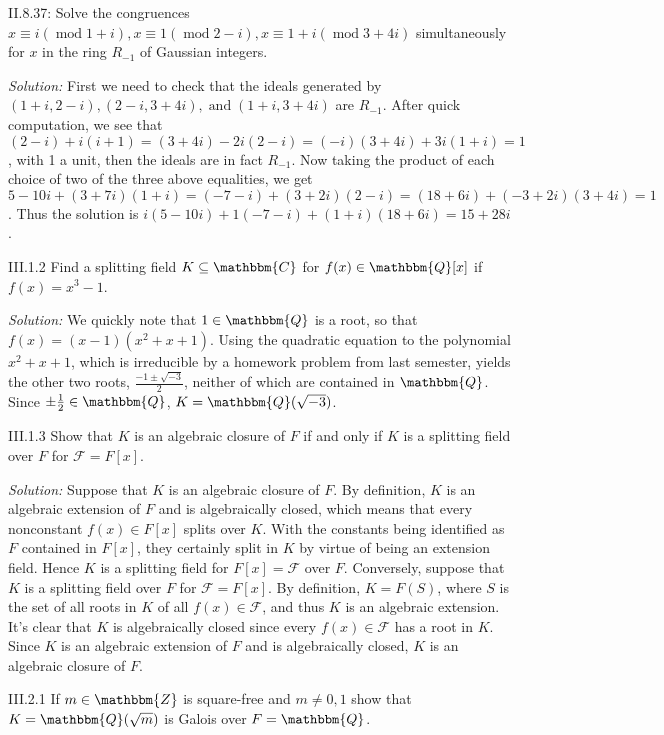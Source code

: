 \documentclass{letter}
\newcommand{\tmem}[1]{{\em #1\/}}
\newcommand{\tmop}[1]{\ensuremath{\operatorname{#1}}}
\begin{document}
II.8.37: Solve the congruences $x \equiv i (\tmop{mod} 1 + i), x \equiv 1
(\tmop{mod} 2 - i), x \equiv 1 + i (\tmop{mod} 3 + 4 i)$ simultaneously for
$x$ in the ring $R_{- 1}$ of Gaussian integers.

{\tmem{Solution:}} First we need to check that the ideals generated by $(1 +
i, 2 - i), (2 - i, 3 + 4 i), \tmop{and} (1 + i, 3 + 4 i)$ are $R_{- 1}$. After
quick computation, we see that $(2 - i) + i (i + 1) = (3 + 4 i) - 2 i (2 - i)
= (- i) (3 + 4 i) + 3 i (1 + i) = 1$, with 1 a unit, then the ideals are in
fact $R_{- 1}$. Now taking the product of each choice of two of the three
above equalities, we get $5 - 10 i + (3 + 7 i) (1 + i) = (- 7 - i) + (3 + 2 i)
(2 - i) = (18 + 6 i) + (- 3 + 2 i) (3 + 4 i) = 1$. Thus the solution is $i (5
- 10 i) + 1 (- 7 - i) + (1 + i) (18 + 6 i) = 15 + 28 i$.

III.1.2 Find a splitting field $K \subseteq \mathbbm{C}$ for $f (x) \in
\mathbbm{Q}[x]$ if $f (x) = x^3 - 1$.

{\tmem{Solution:}} We quickly note that $1 \in \mathbbm{Q}$ is a root, so that
$f (x) = (x - 1) (x^2 + x + 1)$. Using the quadratic equation to the
polynomial $x^2 + x + 1$, which is irreducible by a homework problem from last
semester, yields the other two roots, $\frac{- 1 \pm \sqrt{- 3}}{2}$, neither
of which are contained in $\mathbbm{Q}$. Since $\pm \frac{1}{2} \in
\mathbbm{Q}$, $K =\mathbbm{Q}( \sqrt{- 3})$.

III.1.3 Show that $K$ is an algebraic closure of $F$ if and only if $K$ is a
splitting field over $F$ for $\mathcal{F} = F [x]$.

{\tmem{Solution:}} Suppose that $K$ is an algebraic closure of $F$. By
definition, $K$ is an algebraic extension of $F$ and is algebraically closed,
which means that every nonconstant $f (x) \in F [x]$ splits over $K$. With the
constants being identified as $F$ contained in $F [x]$, they certainly split
in $K$ by virtue of being an extension field. Hence $K$ is a splitting field
for $F [x] = \mathcal{F}$ over $F$. Conversely, suppose that $K$ is a
splitting field over $F$ for $\mathcal{F} = F [x]$. By definition, $K = F
(S)$, where $S$ is the set of all roots in $K$ of all $f (x) \in \mathcal{F}$,
and thus $K$ is an algebraic extension. It's clear that $K$ is algebraically
closed since every $f (x) \in \mathcal{F}$ has a root in $K$. Since $K$ is an
algebraic extension of $F$ and is algebraically closed, $K$ is an algebraic
closure of $F$.

III.2.1 If $m \in \mathbbm{Z}$ is square-free and $m \neq 0, 1$ show that $K
=\mathbbm{Q}( \sqrt{m})$ is Galois over $F =\mathbbm{Q}$.
\end{document}
